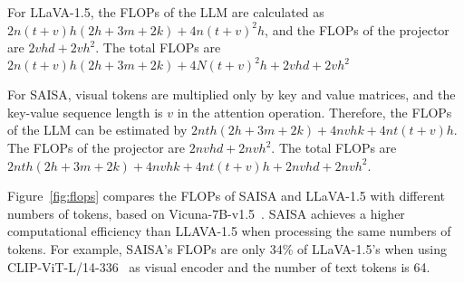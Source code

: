 For LLaVA-1.5, the FLOPs of the LLM are calculated as $2n(t+v)h(2h+3m+2k)+4n(t+v)^2h$, and the FLOPs of the projector are $2vhd+2vh^2$. The total FLOPs are $2n(t+v)h(2h+3m+2k)+4N(t+v)^2h+2vhd+2vh^2$

For SAISA, visual tokens are multiplied only by key and value matrices, and the key-value sequence length is $v$ in the attention operation.
Therefore, the FLOPs of the LLM can be estimated by $2nth(2h+3m+2k)+4nvhk+4nt(t+v)h$.
The FLOPs of the projector are $2nvhd+2nvh^2$.
The total FLOPs are $2nth(2h+3m+2k)+4nvhk+4nt(t+v)h+2nvhd+2nvh^2$.

Figure~\ref{fig:flops} compares the FLOPs of SAISA and LLaVA-1.5 with different numbers of tokens, based on Vicuna-7B-v1.5~\cite{vicuna}.
SAISA achieves a higher computational efficiency than LLAVA-1.5 when processing the same numbers of tokens.
For example, SAISA's FLOPs are only 34\% of LLaVA-1.5's when using CLIP-ViT-L/14-336~\cite{radford2021learningtransferablevisualmodels} as visual encoder and the number of text tokens is 64.